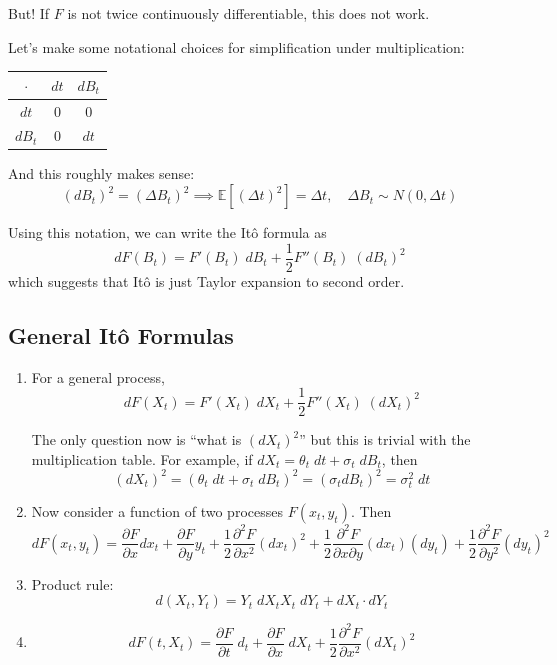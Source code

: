 \documentclass[12pt]{report}
\newcommand{\E}{\mathbb{E}}
\begin{document}
    But! If $F$ is not twice continuously differentiable, this does not work. 

    Let's make some notational choices for simplification under multiplication:
    \begin{center}
        \begin{tabular}{|c|cc|}
            \hline 
            $\cdot$ & $dt$ & $dB_t$\\
            \hline
            $dt$ & $0$ & $0$\\
            $dB_t$ & $0$ & $dt$\\
            \hline
        \end{tabular}
    \end{center}

    And this roughly makes sense:
    \[(dB_t)^2 = (\Delta B_t)^2 \implies \E[(\Delta t)^2] = \Delta t, \quad \Delta B_t \sim N(0, \Delta t)\]

    Using this notation, we can write the Itô formula as
    \[dF(B_t) = F'(B_t) \;dB_t + \frac{1}{2}F''(B_t)\; (dB_t)^2\]
    which suggests that Itô is just Taylor expansion to second order. 

\subsection{General Itô Formulas}
    \begin{enumerate}
        \item For a general process, 
        \[dF(X_t) = F'(X_t) \; dX_t + \frac{1}{2} F''(X_t) \; (dX_t)^2\]

        The only question now is ``what is $(dX_t)^2$'' but this is trivial with the multiplication table. For example, if $dX_t = \theta_t \; dt + \sigma_t \; dB_t$, then 
        \[(dX_t)^2 = (\theta_t\; dt + \sigma_t \; dB_t)^2 = (\sigma_t dB_t)^2 = \sigma_t^2\; dt\] 

        \item Now consider a function of two processes $F(x_t, y_t)$. Then
        \[dF(x_t, y_t) = \frac{\partial F}{\partial x} dx_t +  \frac{\partial F}{\partial y} y_t + \frac{1}{2} \frac{\partial^2 F}{\partial x^2}(dx_t)^2 + \frac{1}{2} \frac{\partial^2 F}{\partial x \partial y}(dx_t) (dy_t) + \frac{1}{2} \frac{\partial^2 F}{\partial y^2}(dy_t)^2\]

        \item Product rule:
        \[d(X_t, Y_t) = Y_t \;dX_t X_t\; dY_t + dX_t \cdot dY_t\]

        \item \[dF(t, X_t) = \frac{\partial F}{\partial t} \; d_t + \frac{\partial F}{\partial x} \; dX_t + \frac{1}{2} \frac{\partial^2 F}{\partial x^2}(dX_t)^2\]
    \end{enumerate}
\end{document}
